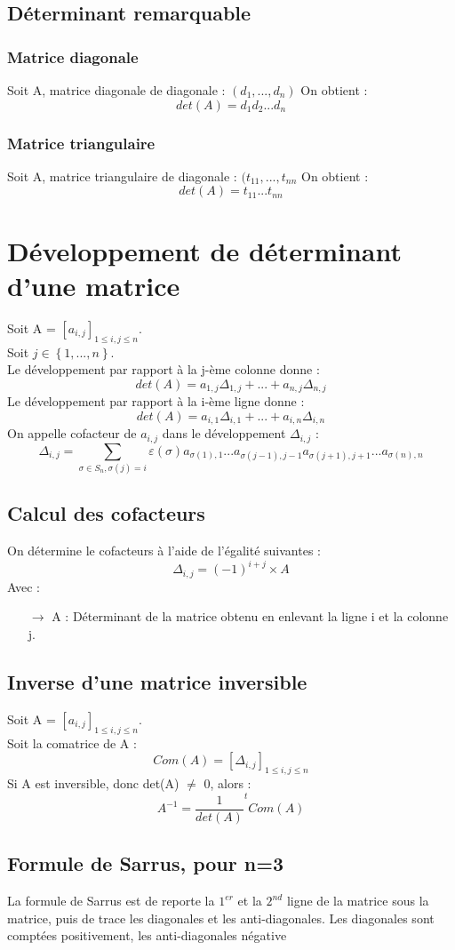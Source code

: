 \subsection{Déterminant remarquable}
\subsubsection{Matrice diagonale}
Soit A, matrice diagonale de diagonale : $(d_1,...,d_n)$
On obtient :
$$det(A)=d_1d_2...d_n$$
\subsubsection{Matrice triangulaire}
Soit A, matrice triangulaire de diagonale : $(t_{11},...,t_{nn}$
On obtient :
$$det(A)=t_{11}...t_{nn}$$
\section{Développement de déterminant d'une matrice}
\begin{de}
Soit A = $[a_{i,j}]_{1 \leq i,j \leq n}$.\\
Soit $j \in \left\lbrace 1,...,n\right\rbrace $.\\
Le développement par rapport à la j-ème colonne donne :
$$det(A) = a_{1,j}\Delta_{1,j}+...+a_{n,j}\Delta_{n,j}$$
Le développement par rapport à la i-ème ligne donne :
$$det(A) = a_{i,1}\Delta_{i,1}+...+a_{i,n}\Delta_{i,n}$$
On appelle cofacteur de $a_{i,j}$ dans le développement $\Delta_{i,j}$ :
$$\Delta_{i,j} = \sum_{\sigma \in S_n,\sigma(j)=i} \varepsilon(\sigma)a_{\sigma(1),1}...a_{\sigma(j-1),j-1}a_{\sigma(j+1),j+1}...a_{\sigma(n),n}$$
\end{de}
\subsection{Calcul des cofacteurs}
\begin{prop}
On détermine le cofacteurs à l'aide de l'égalité suivantes :
$$\Delta_{i,j} = (-1)^{i+j}\times A$$
Avec :
\begin{itemize}
 \item[$\rightarrow$] A : Déterminant de la matrice obtenu en enlevant la ligne i et la colonne j.
\end{itemize}
\end{prop}
\subsection{Inverse d'une matrice inversible}
Soit A = $[a_{i,j}]_{1 \leq i,j \leq n}$.\\
Soit la comatrice de A : 
$$Com(A) = [\Delta_{i,j}]_{1 \leq i,j \leq n}$$
Si A est inversible, donc det(A) $\neq$ 0, alors :
$$A^{-1} = \dfrac{1}{det(A)}^tCom(A)$$
\subsection{Formule de Sarrus, pour n=3}
La formule de Sarrus est de reporte la $1^{er}$ et la $2^{nd}$ ligne de la matrice sous la matrice, puis de trace les diagonales et les anti-diagonales. Les diagonales sont comptées positivement, les anti-diagonales négative
